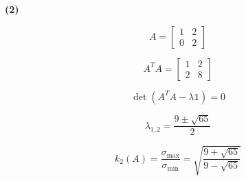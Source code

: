 \documentclass[a4paper,11pt]{article}
\begin{document}
\noindent \textbf{(2)}

\begin{equation}
	A = \begin{bmatrix}
		1 & 2 \\
		0 & 2
	\end{bmatrix}
\end{equation}

\begin{equation}
	A^{T}A = \begin{bmatrix}
		1 & 2 \\
		2 & 8
	\end{bmatrix}
\end{equation}

\begin{equation}
	\det(A^{T}A -\lambda\mathbb{1})=0
\end{equation}

\begin{equation}
	\lambda_{1,2}=\frac{9 \pm \sqrt{65}}{2}
\end{equation}

\begin{equation}
	k_{2}(A) = \frac{\sigma_{\max}}{\sigma_{\min}} = \sqrt{\frac{9+\sqrt{65}}{9-\sqrt{65}}}
\end{equation}
\end{document}
